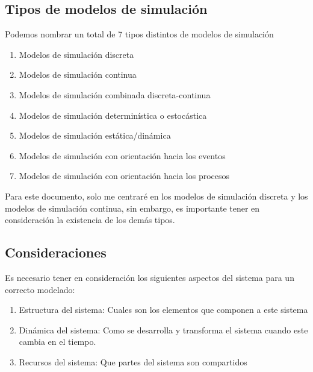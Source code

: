 \subsection*{Tipos de modelos de simulación}
Podemos nombrar un total de 7 tipos distintos de modelos de simulación

\begin{enumerate}
    \item Modelos de simulación discreta
    \item Modelos de simulación continua
    \item Modelos de simulación combinada discreta-continua
    \item Modelos de simulación determinística o estocástica
    \item Modelos de simulación estática/dinámica
    \item Modelos de simulación con orientación hacia los eventos
    \item Modelos de simulación con orientación hacia los procesos
\end{enumerate}

Para este documento, solo me centraré en los modelos de simulación discreta y los modelos de simulación continua, sin embargo, es importante tener en consideración la existencia de los demás tipos.

\subsection*{Consideraciones}
Es necesario tener en consideración los siguientes aspectos del sistema para un correcto modelado:

\begin{enumerate}
    \item Estructura del sistema: Cuales son los elementos que componen a este sistema
    \item Dinámica del sistema: Como se desarrolla y transforma el sistema cuando este cambia en el tiempo.
    \item Recursos del sistema: Que partes del sistema son compartidos
\end{enumerate}
